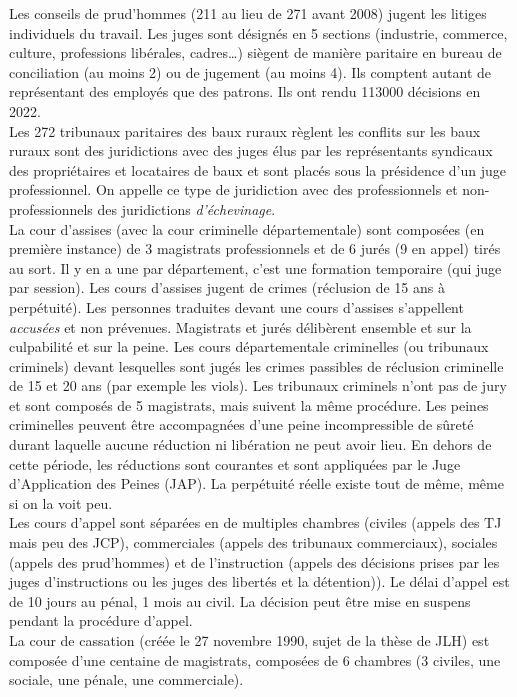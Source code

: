 \documentclass[math]{cours}
\begin{document}
	Les conseils de prud'hommes (211 au lieu de 271 avant 2008) jugent les litiges individuels du travail.
	Les juges sont désignés en 5 sections (industrie, commerce, culture, professions libérales, cadres\ldots) siègent de manière paritaire en bureau de conciliation (au moins 2) ou de jugement (au moins 4).
	Ils comptent autant de représentant des employés que des patrons.
	Ils ont rendu 113000 décisions en 2022.\\
	Les 272 tribunaux paritaires des baux ruraux règlent les conflits sur les baux ruraux sont des juridictions avec des juges élus par les représentants syndicaux des propriétaires et locataires de baux et sont placés sous la présidence d'un juge professionnel.
	On appelle ce type de juridiction avec des professionnels et non-professionnels des juridictions \emph{d'échevinage}.\\
	La cour d'assises (avec la cour criminelle départementale) sont composées (en première instance) de 3 magistrats professionnels et de 6 jurés (9 en appel) tirés au sort.
	Il y en a une par département, c'est une formation temporaire (qui juge par session).
	Les cours d'assises jugent de crimes (réclusion de 15 ans à perpétuité).
	Les personnes traduites devant une cours d'assises s'appellent \emph{accusées} et non prévenues.
	Magistrats et jurés délibèrent ensemble et sur la culpabilité et sur la peine.
	Les cours départementale criminelles (ou tribunaux criminels) devant lesquelles sont jugés les crimes passibles de réclusion criminelle de 15 et 20 ans (par exemple les viols).
	Les tribunaux criminels n'ont pas de jury et sont composés de 5 magistrats, mais suivent la même procédure.
	Les peines criminelles peuvent être accompagnées d'une peine incompressible de sûreté durant laquelle aucune réduction ni libération ne peut avoir lieu.
	En dehors de cette période, les réductions sont courantes et sont appliquées par le Juge d'Application des Peines (JAP).
	La perpétuité réelle existe tout de même, même si on la voit peu.\\
	Les cours d'appel sont séparées en de multiples chambres (civiles (appels des TJ mais peu des JCP), commerciales (appels des tribunaux commerciaux), sociales (appels des prud'hommes) et de l'instruction (appels des décisions prises par les juges d'instructions ou les juges des libertés et la détention)).
	Le délai d'appel est de 10 jours au pénal, 1 mois au civil.
	La décision peut être mise en suspens pendant la procédure d'appel.\\
	La cour de cassation (créée le 27 novembre 1990, sujet de la thèse de JLH) est composée d'une centaine de magistrats, composées de 6 chambres (3 civiles, une sociale, une pénale, une commerciale).
\end{document}
